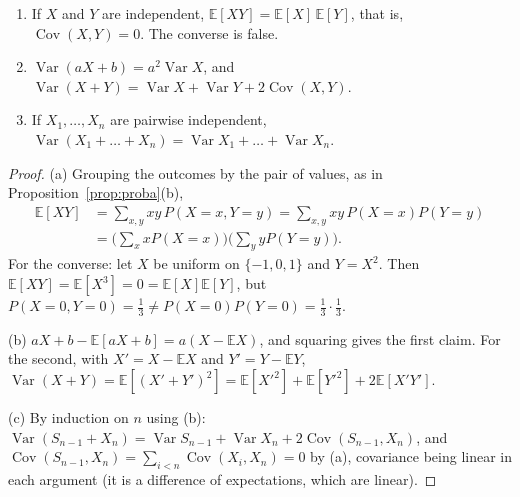 \begin{proposition}\label{prop:varsum}
\begin{enumerate}[label=(\alph*)]
\item If $X$ and $Y$ are independent, $\mathbb E[XY]=\mathbb E[X]\,\mathbb E[Y]$, that is, $\operatorname{Cov}(X,Y)=0$. The converse is false.
\item $\operatorname{Var}(aX+b)=a^2\operatorname{Var}X$, and $\operatorname{Var}(X+Y)=\operatorname{Var}X+\operatorname{Var}Y+2\operatorname{Cov}(X,Y)$.
\item If $X_1,\dots,X_n$ are pairwise independent, $\operatorname{Var}(X_1+\dots+X_n)=\operatorname{Var}X_1+\dots+\operatorname{Var}X_n$.
\end{enumerate}
\end{proposition}
\begin{proof}
(a) Grouping the outcomes by the pair of values, as in Proposition~\ref{prop:proba}(b),
\[
\begin{aligned}\mathbb E[XY]&=\sum_{x,y}xy\,P(X=x,Y=y)=\sum_{x,y}xy\,P(X=x)P(Y=y)\\&=\Big(\sum_xxP(X=x)\Big)\Big(\sum_yyP(Y=y)\Big).\end{aligned}
\]
For the converse: let $X$ be uniform on $\{-1,0,1\}$ and $Y=X^2$. Then $\mathbb E[XY]=\mathbb E[X^3]=0=\mathbb E[X]\mathbb E[Y]$, but $P(X=0,Y=0)=\frac13\ne P(X=0)P(Y=0)=\frac13\cdot\frac13$.

(b) $aX+b-\mathbb E[aX+b]=a(X-\mathbb EX)$, and squaring gives the first claim. For the second, with $X'=X-\mathbb EX$ and $Y'=Y-\mathbb EY$, $\operatorname{Var}(X+Y)=\mathbb E[(X'+Y')^2]=\mathbb E[X'^2]+\mathbb E[Y'^2]+2\mathbb E[X'Y']$.

(c) By induction on $n$ using (b): $\operatorname{Var}(S_{n-1}+X_n)=\operatorname{Var}S_{n-1}+\operatorname{Var}X_n+2\operatorname{Cov}(S_{n-1},X_n)$, and $\operatorname{Cov}(S_{n-1},X_n)=\sum_{i<n}\operatorname{Cov}(X_i,X_n)=0$ by (a), covariance being linear in each argument (it is a difference of expectations, which are linear).
\end{proof}

